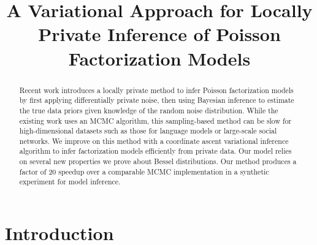 \documentclass[letterpaper]{article}
\title{A Variational Approach for Locally Private Inference of Poisson Factorization Models}
\author{} %
\begin{document}
\maketitle

\begin{abstract}
    Recent work \citep{schein2018locally} introduces a locally private method to
    infer Poisson factorization models by first applying differentially private
    noise, then using Bayesian inference to estimate the true data priors given
    knowledge of the random noise distribution. While the existing work uses an
    MCMC algorithm, this sampling-based method can be slow for high-dimensional
    datasets such as those for language models or large-scale social networks.
    We improve on this method with a coordinate ascent variational inference
    algorithm to infer factorization models efficiently from private data. Our
    model relies on several new properties we prove about Bessel distributions.
    Our method produces a factor of 20 speedup over a comparable MCMC
    implementation in a synthetic experiment for model inference.
  \end{abstract}

  \section{Introduction}
  
\end{document}
